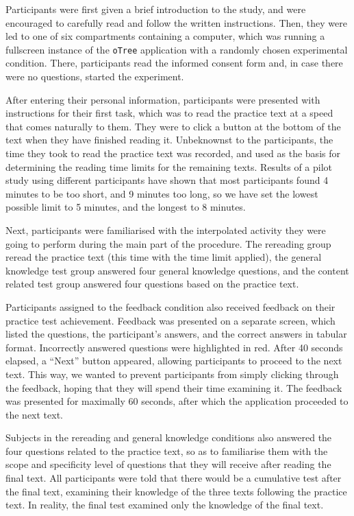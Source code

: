 \documentclass[12pt,]{article}
\begin{document}
Participants were first given a brief introduction to the study, and
were encouraged to carefully read and follow the written instructions.
Then, they were led to one of six compartments containing a computer,
which was running a fullscreen instance of the \texttt{oTree}
application with a randomly chosen experimental condition. There,
participants read the informed consent form and, in case there were no
questions, started the experiment.

After entering their personal information, participants were presented
with instructions for their first task, which was to read the practice
text at a speed that comes naturally to them. They were to click a
button at the bottom of the text when they have finished reading it.
Unbeknownst to the participants, the time they took to read the practice
text was recorded, and used as the basis for determining the reading
time limits for the remaining texts. Results of a pilot study using
different participants have shown that most participants found 4 minutes
to be too short, and 9 minutes too long, so we have set the lowest
possible limit to 5 minutes, and the longest to 8 minutes.

Next, participants were familiarised with the interpolated activity they
were going to perform during the main part of the procedure. The
rereading group reread the practice text (this time with the time limit
applied), the general knowledge test group answered four general
knowledge questions, and the content related test group answered four
questions based on the practice text.

Participants assigned to the feedback condition also received feedback
on their practice test achievement. Feedback was presented on a separate
screen, which listed the questions, the participant's answers, and the
correct answers in tabular format. Incorrectly answered questions were
highlighted in red. After 40 seconds elapsed, a ``Next'' button
appeared, allowing participants to proceed to the next text. This way,
we wanted to prevent participants from simply clicking through the
feedback, hoping that they will spend their time examining it. The
feedback was presented for maximally 60 seconds, after which the
application proceeded to the next text.

Subjects in the rereading and general knowledge conditions also answered
the four questions related to the practice text, so as to familiarise
them with the scope and specificity level of questions that they will
receive after reading the final text. All participants were told that
there would be a cumulative test after the final text, examining their
knowledge of the three texts following the practice text. In reality,
the final test examined only the knowledge of the final text.
\end{document}
